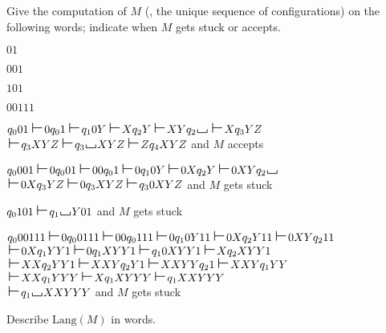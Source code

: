 \documentclass{exercise}
\begin{document}
\subtask Give the computation of $M$ (\ie, the unique sequence of configurations) on
  the following words; indicate when $M$ gets stuck or accepts.

  \begin{taskitems}
    \item $01$
    \item $001$
    \item $101$
    \item $00111$
  \end{taskitems}

  \begin{solution}
    \begin{taskitems}
		  \item $q_001 \tmmove 0q_01 \tmmove q_10Y \tmmove Xq_2Y \tmmove XYq_2\blank \tmmove Xq_3YZ$\\[1mm]
			      \hspace*{0.66cm} $\tmmove q_3XYZ \tmmove q_3\blank XYZ \tmmove Zq_4XYZ$ \hfill and $M$ accepts
		  \item $q_0001 \tmmove 0q_001 \tmmove 00q_01 \tmmove 0q_10Y \tmmove 0Xq_2Y \tmmove 0XYq_2\blank$\\[1mm]
						\hspace*{0.85cm} $\tmmove 0Xq_3YZ \tmmove 0q_3XYZ\tmmove q_30XYZ$ \hfill and $M$ gets stuck
			\item $q_0101 \tmmove q_1\blank Y01$ \hfill and $M$ gets stuck
      \item $q_000111 \tmmove 0q_00111 \tmmove 00q_0111 \tmmove 0q_10Y11 \tmmove 0Xq_2Y11 \tmmove 0XYq_211$\\[1mm]
			      \hspace*{1.25cm} $\tmmove 0Xq_1YY1 \tmmove 0q_1XYY1 \tmmove q_10XYY1 \tmmove Xq_2XYY1$\\[1mm]
			      \hspace*{1.25cm} $\tmmove XXq_2YY1 \tmmove XXYq_2Y1 \tmmove XXYYq_21 \tmmove XXYq_1YY$\\[1mm]
			      \hspace*{1.25cm} $\tmmove XXq_1YYY \tmmove Xq_1XYYY \tmmove q_1XXYYY$\\[1mm]
						\hspace*{1.25cm} $\tmmove q_1\blank XXYYY$  \hfill and $M$ gets stuck
    \end{taskitems}
  \end{solution}

\subtask Describe $\text{Lang}(M)$ in words.
\end{document}
